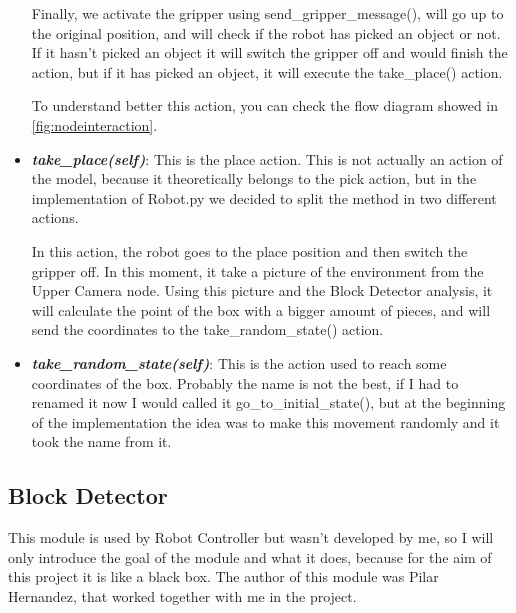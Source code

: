 \begin{itemize}
	 			Finally, we activate the gripper using send\_gripper\_message(), will go up to the original position, and will check if the robot has picked an object or not. If it hasn't picked an object it will switch the gripper off and would finish the action, but if it has picked an object, it will execute the take\_place() action.
	 			
	 			To understand better this action, you can check the flow diagram showed in \autoref{fig:nodeinteraction}.
	 			
	 			\item[\textendash]\textbf{\textit{take\_place(self)}}: This is the place action. This is not actually an action of the model, because it theoretically belongs to the pick action, but in the implementation of Robot.py we decided to split the method in two different actions.
	 			
	 			In this action, the robot goes to the place position and then switch the gripper off. In this moment, it take a picture of the environment from the Upper Camera node. Using this picture and the Block Detector analysis, it will calculate the point of the box with a bigger amount of pieces, and will send the coordinates to the take\_random\_state() action.
	 			
	 			\item[\textendash]\textbf{\textit{take\_random\_state(self)}}: This is the action used to reach some coordinates of the box. Probably the name is not the best, if I had to renamed it now I would called it go\_to\_initial\_state(), but at the beginning of the implementation the idea was to make this movement randomly and it took the name from it.
	 			
	 		\end{itemize}
 		
		
		\subsection{Block Detector}
		
			This module is used by Robot Controller but wasn't developed by me, so I will only introduce the goal of the module and what it does, because for the aim of this project it is like a black box. The author of this module was Pilar Hernandez, that worked together with me in the project.
			
